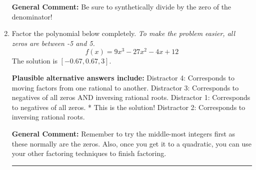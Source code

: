 \documentclass{extbook}[14pt]
\newcommand{\litem}[1]{\item #1

\rule{\textwidth}{0.4pt}}
\begin{document}
\begin{enumerate}
{\textbf{General Comment:} Be sure to synthetically divide by the zero of the denominator!
}
\litem{
Factor the polynomial below completely. \textit{To make the problem easier, all zeros are between -5 and 5.}
\[ f(x) = 9x^{3} -27 x^{2} -4 x + 12 \]The solution is \( [-0.67, 0.67, 3] \).\begin{enumerate}[label=\Alph*.]
\textbf{Plausible alternative answers include:} Distractor 4: Corresponds to moving factors from one rational to another.
 Distractor 3: Corresponds to negatives of all zeros AND inversing rational roots.
 Distractor 1: Corresponds to negatives of all zeros.
* This is the solution!
 Distractor 2: Corresponds to inversing rational roots.
\end{enumerate}

\textbf{General Comment:} Remember to try the middle-most integers first as these normally are the zeros. Also, once you get it to a quadratic, you can use your other factoring techniques to finish factoring.
}
\end{enumerate}
\end{document}
